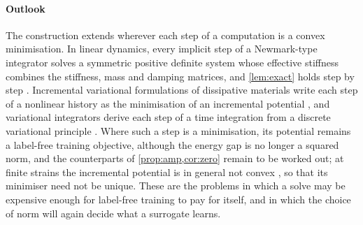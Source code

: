 \paragraph{Outlook}
The construction extends wherever each step of a computation is a convex minimisation. In
linear dynamics, every implicit step of a Newmark-type integrator solves a symmetric
positive definite system whose effective stiffness combines the stiffness, mass and damping
matrices, and \cref{lem:exact} holds step by step \cite{CaoSong2026}. Incremental
variational formulations of dissipative materials write each step of a nonlinear history as
the minimisation of an incremental potential \cite{OrtizStainier1999}, and variational
integrators derive each step of a time integration from a discrete variational principle
\cite{MarsdenWest2001}. Where such a step is a minimisation, its potential remains a
label-free training objective, although the energy gap is no longer a squared norm, and the
counterparts of \cref{prop:amp,cor:zero} remain to be worked out; at finite strains the
incremental potential is in general not convex \cite{OrtizStainier1999}, so that its
minimiser need not be unique. These are the problems in which a solve may be expensive
enough for label-free training to pay for itself, and in which the choice of norm will again
decide what a surrogate learns.
